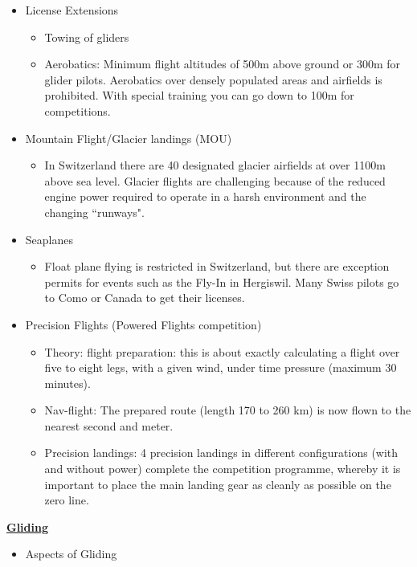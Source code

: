 \documentclass[9pt, landscape, fleqn]{scrartcl}
\begin{document}
\begin{multicols*}{3}
\begin{itemize}
    \item License Extensions
    \begin{itemize}
        \item Towing of gliders
        \item Aerobatics: Minimum flight altitudes of 500m above
        ground or 300m for glider pilots. Aerobatics over densely populated areas and airfields is prohibited.
        With special training you can go down to 100m for competitions.
    \end{itemize}
    \item Mountain Flight/Glacier landings (MOU)
        \begin{itemize}
            \item In Switzerland there are 40 designated glacier airfields at over 1100m above sea level.
            Glacier flights are challenging because of the reduced engine power required to operate in a harsh environment and the changing “runways".
        \end{itemize}
    \item Seaplanes 
    \begin{itemize}
        \item Float plane flying is restricted in Switzerland, but there are exception permits for events such as the Fly-In in Hergiswil.
        Many Swiss pilots go to Como or Canada to get their licenses.
    \end{itemize} 
    \item Precision Flights (Powered Flights competition)
    \begin{itemize}
        \item Theory: flight preparation: this is about exactly calculating a flight over five to eight legs, with a given wind, under time pressure (maximum 30 minutes).
        \item Nav-flight: The prepared route (length 170 to 260 km) is now flown to the nearest second and meter.
        \item Precision landings: 4 precision landings in different configurations (with and without power) complete the competition programme, whereby it is important to place the main landing gear as cleanly as possible on the zero line.
    \end{itemize}   
\end{itemize}
\underline{\textbf{Gliding}}
\begin{itemize}
    \item Aspects of Gliding
    \begin{itemize}

\end{itemize}
\end{itemize}
\end{multicols*}
\end{document}
